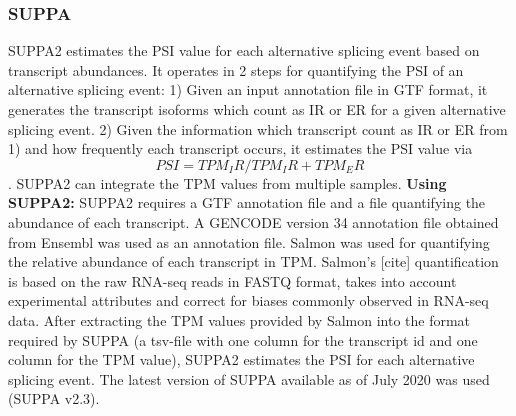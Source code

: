 \subsubsection{SUPPA}\label{subsubsec:suppa}
SUPPA2 \cite{suppa2} estimates the PSI value for each alternative splicing event based on transcript abundances. It operates in 2 steps for quantifying the PSI of an alternative splicing event:
1) Given an input annotation file in GTF format, it generates the transcript isoforms which count as IR or ER for a given alternative splicing event.
2) Given the information which transcript count as IR or ER from 1) and how frequently each transcript occurs, it estimates the PSI value via $$PSI = TPM_IR / TPM_IR + TPM_ER$$. SUPPA2 can integrate the TPM values from multiple samples.
\textbf{Using SUPPA2:}
SUPPA2 requires a GTF annotation file and a file quantifying the abundance of each transcript. A GENCODE version 34 annotation file obtained from Ensembl was used as an annotation file. Salmon was used for quantifying the relative abundance of each transcript in TPM. Salmon's [cite] quantification is based on the raw RNA-seq reads in FASTQ format, takes into account experimental attributes and correct for biases commonly observed in RNA-seq data. After extracting the TPM values provided by Salmon into the format required by SUPPA (a tsv-file with one column for the transcript id and one column for the TPM value), SUPPA2 estimates the PSI for each alternative splicing event.
The latest version of SUPPA available as of July 2020 was used (SUPPA v2.3). 
